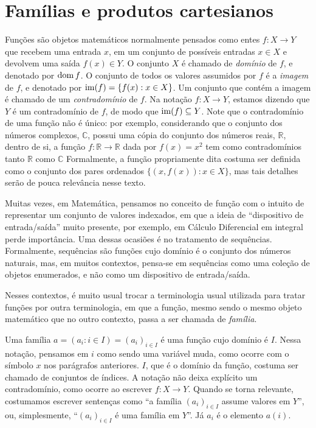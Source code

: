 \section{Famílias e produtos cartesianos}
Funções são objetos matemáticos normalmente pensados como entes $f:X\rightarrow Y$ que recebem uma entrada $x$, em um conjunto de possíveis entradas $x \in X$ e devolvem uma saída $f(x)\in Y$.
O conjunto $X$ é chamado de \emph{domínio} de $f$, e denotado por $\operatorname{dom} f$. O conjunto de todos os valores assumidos por $f$ é a \emph{imagem} de $f$, e denotado por $\operatorname{im}(f)=\{f(x): x \in X\}$.
Um conjunto que contém a imagem é chamado de um \emph{contradomínio} de $f$.
Na notação $f:X\rightarrow Y$, estamos dizendo que $Y$ é um contradomínio de $f$, de modo que $\operatorname{im}(f)\subseteq Y$.
Note que o contradomínio de uma função não é único: por exemplo, considerando que o conjunto dos números complexos, $\mathbb C$, possui uma cópia do conjunto dos números reais, $\mathbb R$, dentro de si, a função $f:\mathbb R\rightarrow \mathbb R$ dada por $f(x)=x^2$ tem como contradomínios tanto $\mathbb R$ como $\mathbb C$
Formalmente, a função propriamente dita costuma ser definida como o conjunto dos pares ordenados $\{(x, f(x)): x \in X\}$, mas tais detalhes serão de pouca relevância nesse texto.

Muitas vezes, em Matemática, pensamos no conceito de função com o intuito de representar um conjunto de valores indexados, em que a ideia de ``dispositivo de entrada/saída'' muito presente, por exemplo, em Cálculo Diferencial em integral perde importância. Uma dessas ocasiões é no tratamento de sequências. Formalmente, sequências são funções cujo domínio é o conjunto dos números naturais, mas, em muitos contextos, pensa-se em sequências como uma coleção de objetos enumerados, e não como um dispositivo de entrada/saída.

Nesses contextos, é muito usual trocar a terminologia usual utilizada para tratar funções por outra terminologia, em que a função, mesmo sendo o mesmo objeto matemático que no outro contexto, passa a ser chamada de \emph{família}.

Uma família $a=(a_i: i \in I)=(a_i)_{i \in I}$ é uma função cujo domínio é $I$.
Nessa notação, pensamos em $i$ como sendo uma variável muda, como ocorre com o símbolo $x$ nos parágrafos anteriores.
$I$, que é o domínio da função, costuma ser chamado de conjuntos de índices.
A notação não deixa explícito um contradomínio, como ocorre ao escrever $f:X\rightarrow Y$.
Quando se torna relevante, costumamos escrever sentenças como ``a família $(a_i)_{i \in I}$ assume valores em $Y$'', ou, simplesmente, ``$(a_i)_{i \in I}$ é uma família em $Y$''.
Já $a_i$ é o elemento $a(i)$.

